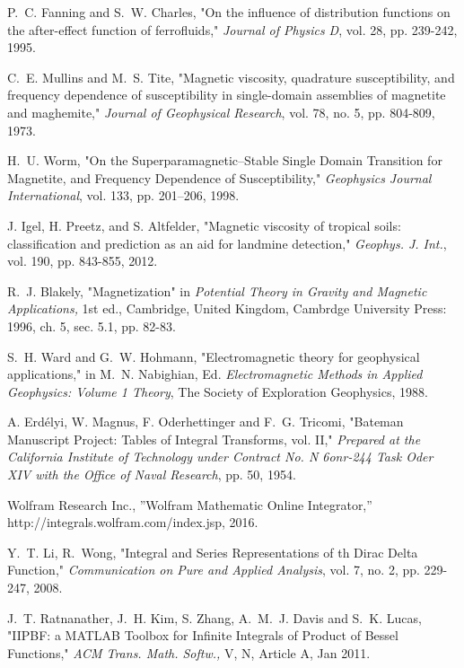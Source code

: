 \documentclass[journal]{IEEEtran}  %
\begin{document}
\begin{thebibliography}{100}
P.~C. Fanning and S.~W. Charles, "On the influence of distribution functions on the after-effect function of ferrofluids," \emph{Journal of Physics D}, vol. 28, pp. 239-242, 1995.

C.~E. Mullins and M.~S. Tite, "Magnetic viscosity, quadrature susceptibility, and frequency dependence of susceptibility in single-domain assemblies of magnetite and maghemite," \emph{Journal of Geophysical Research}, vol. 78, no. 5, pp. 804-809, 1973.

H.~U. Worm, "On the Superparamagnetic–Stable Single Domain Transition for Magnetite, and Frequency Dependence of Susceptibility," \emph{Geophysics Journal International}, vol. 133, pp. 201–206, 1998.

J. Igel, H. Preetz, and S. Altfelder, "Magnetic viscosity of tropical soils: classification and prediction as an aid for landmine detection," \emph{Geophys. J. Int.}, vol. 190, pp. 843-855, 2012.

R.~J. Blakely, "Magnetization" in \emph{Potential Theory in Gravity and Magnetic Applications,} 1st ed., Cambridge, United Kingdom, Cambrdge University Press: 1996, ch. 5, sec. 5.1, pp. 82-83.

S.~H. Ward and G.~W. Hohmann, "Electromagnetic theory for geophysical applications," in M.~N. Nabighian, Ed. \emph{Electromagnetic Methods in Applied Geophysics: Volume 1 Theory}, The Society of Exploration Geophysics, 1988.

A. Erd\'{e}lyi, W. Magnus, F. Oderhettinger and F.~G. Tricomi, "Bateman Manuscript Project: Tables of Integral Transforms, vol. II," \emph{Prepared at the California Institute of Technology under Contract No. N 6onr-244 Task Oder XIV with the Office of Naval Research}, pp. 50, 1954.

Wolfram Research Inc., ”Wolfram Mathematic Online Integrator,” http://integrals.wolfram.com/index.jsp, 2016. 

Y.~T. Li, R.~Wong, "Integral and Series Representations of th Dirac Delta Function," \emph{Communication on Pure and Applied Analysis}, vol. 7, no. 2, pp. 229-247, 2008.

J.~T. Ratnanather, J.~H. Kim, S. Zhang, A.~M.~J. Davis and S.~K. Lucas, "IIPBF: a MATLAB Toolbox for Infinite Integrals of Product of Bessel Functions," \emph{ACM Trans. Math. Softw.,} V, N, Article A, Jan 2011.


\end{thebibliography}
\end{document}

